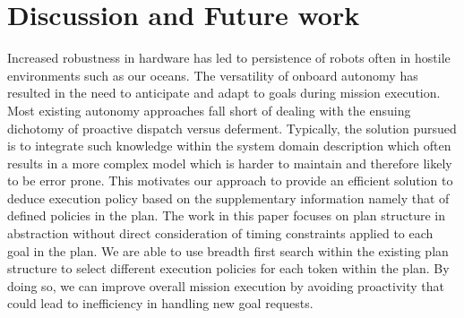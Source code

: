 \section{Discussion and Future work}
\label{sec:conclude}

Increased robustness in hardware has led to persistence of robots
often in hostile environments such as our oceans. The versatility of
onboard autonomy has resulted in the need to anticipate and adapt to
goals during mission execution.  Most existing autonomy approaches
fall short of dealing with the ensuing dichotomy of proactive dispatch
versus deferment.  Typically, the solution pursued is to integrate
such knowledge within the system domain description which often
results in a more complex model which is harder to maintain and
therefore likely to be error prone.  This motivates our approach to
provide an efficient solution to deduce execution policy based on the
supplementary information namely that of defined policies in the plan.  The work
in this paper focuses on plan structure in abstraction without direct
consideration of timing constraints applied to each goal in the
plan. We are able to use breadth first search within the
existing plan structure to select different execution policies for
each token within the plan. By doing so, we can improve overall
mission execution by avoiding proactivity that could lead to
inefficiency in handling new goal requests.

